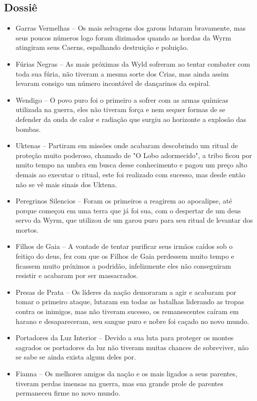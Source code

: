 \subsection{\bf Dossiê}
\begin{itemize}
    \item Garras Vermelhas – Os mais selvagens dos garous lutaram bravamente, mas seus poucos números logo foram dizimados quando as hordas da Wyrm atingiram seus Caerns, espalhando destruição e poluição.
    \item Fúrias Negras – As mais próximas da Wyld sofreram ao tentar combater com toda sua fúria, não tiveram a mesma sorte dos Crias, mas ainda assim levaram consigo um número incontável de dançarinos da espiral.
    \item Wendigo – O povo puro foi o primeiro a sofrer com as armas químicas utilizada na guerra, eles não tiveram força e nem sequer formas de se defender da onda de calor e radiação que surgiu ao horizonte a explosão das bombas.
    \item Uktenas – Partiram em missões onde acabaram descobrindo um ritual de proteção muito poderoso, chamado de "O Lobo adormecido", a tribo ficou por muito tempo na umbra em busca desse conhecimento e pagou um preço alto demais ao executar o ritual, este foi realizado com sucesso, mas desde então não se vê mais sinais dos Uktena.
    \item Peregrinos Silencios – Foram os primeiros a reagirem ao apocalipse, até porque começou em uma terra que já foi sua, com o despertar de um deus servo da Wyrm, que utilizou de um garou puro para seu ritual de levantar dos mortos.
    \item Filhos de Gaia – A vontade de tentar purificar seus irmãos caídos sob o feitiço do deus, fez com que os Filhos de Gaia perdessem muito tempo e ficassem muito próximos a podridão, infelizmente eles não conseguiram resistir e acabaram por ser massacrados.
    \item Presas de Prata – Os líderes da nação demoraram a agir e acabaram por tomar o primeiro ataque, lutaram em todas as batalhas liderando as tropas contra os inimigos, mas não tiveram sucesso, os remanescentes caíram em harano e desapareceram, seu sangue puro e nobre foi caçado no novo mundo.
    \item Portadores da Luz Interior – Devido a sua luta para proteger os montes sagrados os portadores da luz não tiveram muitas chances de sobreviver, não se sabe se ainda exista algum deles por.
    \item Fianna – Os melhores amigos da nação e os mais ligados a seus parentes, tiveram perdas imensas na guerra, mas sua grande prole de parentes permaneceu firme no novo mundo.

\end{itemize}
